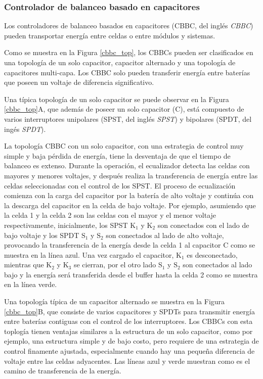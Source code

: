 \subsubsection{Controlador de balanceo basado en capacitores}

Los controladores de balanceo basados en capacitores (\acrshort{CBBC}, del
ingl\'es \emph{\acrlong{CBBC}}) pueden transportar energ\'ia entre celdas o
entre m\'odulos y sistemas.

Como se muestra en la Figura \ref{cbbc_top}, los \acrshort{CBBC}s pueden ser 
clasificados en una topolog\'ia de un solo capacitor, capacitor alternado y una 
topolog\'ia de capacitores multi-capa. Los \acrshort{CBBC} solo pueden 
transferir energ\'ia entre bater\'ias que poseen un voltaje de diferencia 
significativo.

Una t\'ipica topolog\'ia de un solo capacitor se puede observar en la Figura
\ref{cbbc_top}A, que adem\'as de poseer un solo capacitor (C), est\'a compuesto
de varios interruptores unipolares (\acrshort{SPST}, del ingl\'es 
\emph{\acrlong{SPST}}) y bipolares (\acrshort{SPDT}, del ing\'es 
\emph{\acrlong{SPDT}}). 

La topolog\'ia \acrshort{CBBC} con un solo capacitor, con una estrategia de
control muy simple y baja p\'erdida de energ\'ia, tiene la desventaja de que el
tiempo de balanceo es extenso. Durante la operaci\'on, el ecualizador detecta
las celdas con mayores y menores voltajes, y despu\'es realiza la transferencia
de energ\'ia entre las celdas seleccionadas con el control de los
\acrshort{SPST}. El proceso de ecualizaci\'on comienza con la carga del
capacitor por la bater\'ia de alto voltaje y contin\'ua con la descarga del
capacitor en la celda de bajo voltaje. Por ejemplo, asumiendo que la celda 1 y
la celda 2 son las celdas con el mayor y el menor voltaje respectivamente,
inicialmente, los \acrshort{SPST} $\mathrm{K_1}$ y $\mathrm{K_2}$ son conectados
con el lado de bajo voltaje y los \acrshort{SPDT} $\mathrm{S_1}$ y 
$\mathrm{S_2}$ son conectados al lado de alto voltaje, provocando la
transferencia de la energ\'ia desde la celda 1 al capacitor C como se muestra en
la línea azul. Una vez cargado el capacitor, $\mathrm{K_1}$ es desconectado,
mientras que $\mathrm{K_2}$ y $\mathrm{K_3}$ se cierran, por el otro lado
$\mathrm{S_1}$ y $\mathrm{S_2}$ son conectados al lado bajo y la energ\'ia
ser\'a transferida desde el buffer hasta la celda 2 como se muestra en la línea
verde.

Una topolog\'ia t\'ipica de un capacitor alternado se muestra en la Figura
\ref{cbbc_top}B, que consiste de varios capacitores y \acrshort{SPDT}s para
transmitir energ\'ia entre bater\'ias contiguas con el control de los
interruptores. Los \acrshort{CBBC}s con esta toplog\'ia tienen ventajas 
similares a la estructura de un solo capacitor, como por ejemplo, una estructura 
simple y de bajo costo, pero requiere de una estrategia de control finamente 
ajustada, especialmente cuando hay una pequeña diferencia de voltaje entre las 
celdas adyacentes. Las líneas azul y verde muestran como es el camino de 
transferencia de la energ\'ia.

